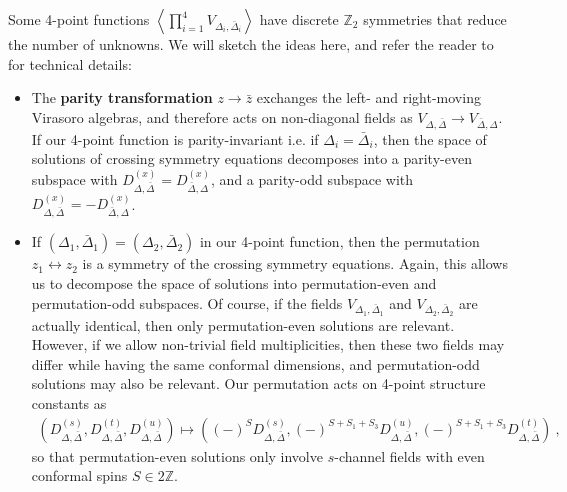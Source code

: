 \documentclass[12pt, a4paper]{article}
\newcommand{\myindex}[1]{\textbf{\boldmath #1}}
\theoremstyle{break}
\begin{document}
Some 4-point functions $\left<\prod_{i=1}^4 V_{\Delta_i,\bar\Delta_i}\right>$ have discrete $\mathbb{Z}_2$ symmetries that reduce the number of unknowns. We will sketch the ideas here, and refer the reader to \cite[Section 2.4]{nrj23} for technical details:
\begin{itemize}
 \item The \myindex{parity transformation} $z\to \bar z$ exchanges the left- and right-moving Virasoro algebras, and therefore acts on non-diagonal fields as $V_{\Delta,\bar\Delta}\to V_{\bar\Delta,\Delta}$. If our 4-point function is parity-invariant i.e. if $\Delta_i=\bar\Delta_i$, then the space of solutions of crossing symmetry equations decomposes into a parity-even subspace with $D^{(x)}_{\Delta,\bar\Delta}=D^{(x)}_{\bar\Delta,\Delta}$, and a parity-odd subspace with $D^{(x)}_{\Delta,\bar\Delta}=-D^{(x)}_{\bar\Delta,\Delta}$. 
 \item If $(\Delta_1,\bar\Delta_1)=(\Delta_2,\bar\Delta_2)$ in our 4-point function, then 
the permutation $z_1\leftrightarrow z_2$ is a symmetry of the crossing symmetry equations. Again, this allows us to decompose the space of solutions into permutation-even and permutation-odd subspaces. Of course, if the fields $V_{\Delta_1,\bar\Delta_1}$ and $V_{\Delta_2,\bar\Delta_2}$ are actually identical, then only permutation-even solutions are relevant. However, if we allow non-trivial field multiplicities, then these two fields may differ while having the same conformal dimensions, and permutation-odd solutions may also be relevant. 
Our permutation acts on 4-point structure constants as 
\begin{align}
\left(D^{(s)}_{\Delta,\bar\Delta},D^{(t)}_{\Delta,\bar\Delta},D^{(u)}_{\Delta,\bar\Delta}\right) \mapsto \left((-)^{S}D^{(s)}_{\Delta,\bar\Delta},(-)^{S+S_1+S_3}D^{(u)}_{\Delta,\bar\Delta},(-)^{S+S_1+S_3}D^{(t)}_{\Delta,\bar\Delta}\right)\ ,
\end{align}
so that permutation-even solutions only involve $s$-channel fields with even conformal spins $S\in 2\mathbb{Z}$. 
\end{itemize}
\end{document}
